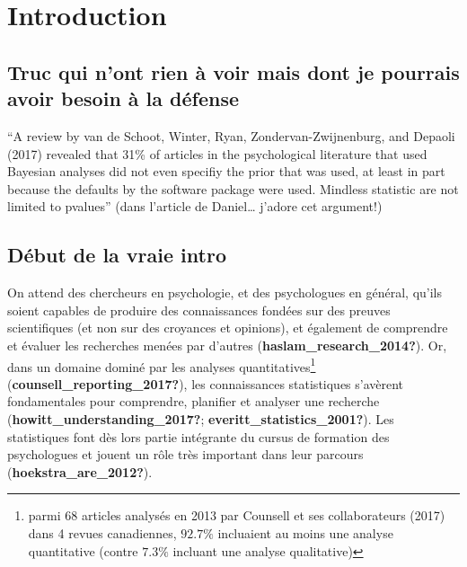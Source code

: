 \documentclass[
  english,
  man]{apa6}
\author{\phantom{0}}
\date{}
\affiliation{\phantom{0}}
\begin{document}


\hypertarget{introduction}{%
\section{Introduction}\label{introduction}}

\hypertarget{truc-qui-nont-rien-uxe0-voir-mais-dont-je-pourrais-avoir-besoin-uxe0-la-duxe9fense}{%
\subsection{Truc qui n'ont rien à voir mais dont je pourrais avoir besoin à la défense}\label{truc-qui-nont-rien-uxe0-voir-mais-dont-je-pourrais-avoir-besoin-uxe0-la-duxe9fense}}

``A review by van de Schoot, Winter, Ryan, Zondervan-Zwijnenburg, and Depaoli (2017) revealed that 31\% of articles in the psychological literature that used Bayesian analyses did not even specifiy the prior that was used, at least in part because the defaults by the software package were used. Mindless statistic are not limited to pvalues'' (dans l'article de Daniel\ldots{} j'adore cet argument!)

\hypertarget{duxe9but-de-la-vraie-intro}{%
\subsection{Début de la vraie intro}\label{duxe9but-de-la-vraie-intro}}

On attend des chercheurs en psychologie, et des psychologues en général, qu'ils soient capables de produire des connaissances fondées sur des preuves scientifiques (et non sur des croyances et opinions), et également de comprendre et évaluer les recherches menées par d'autres (\textbf{haslam\_research\_2014?}). Or, dans un domaine dominé par les analyses quantitatives\footnote{parmi 68 articles analysés en 2013 par Counsell et ses collaborateurs (2017) dans 4 revues canadiennes, $92.7 \%$ incluaient au moins une analyse quantitative (contre $7.3 \%$ incluant une analyse qualitative)} (\textbf{counsell\_reporting\_2017?}), les connaissances statistiques s'avèrent fondamentales pour comprendre, planifier et analyser une recherche (\textbf{howitt\_understanding\_2017?}; \textbf{everitt\_statistics\_2001?}). Les statistiques font dès lors partie intégrante du cursus de formation des psychologues et jouent un rôle très important dans leur parcours (\textbf{hoekstra\_are\_2012?}).
\end{document}
